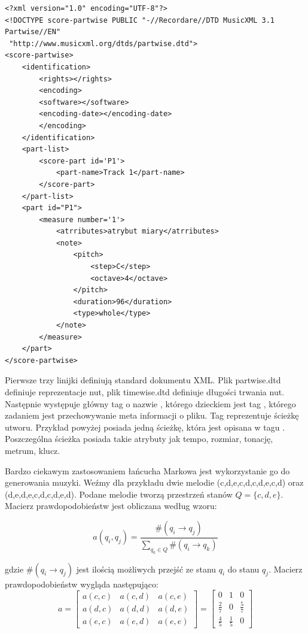 \begin{lstlisting}
<?xml version="1.0" encoding="UTF-8"?>
<!DOCTYPE score-partwise PUBLIC "-//Recordare//DTD MusicXML 3.1 Partwise//EN"
 "http://www.musicxml.org/dtds/partwise.dtd">
<score-partwise>
	<identification>
		<rights></rights>
		<encoding>
		<software></software>
		<encoding-date></encoding-date>
		</encoding>
	</identification>
	<part-list>
		<score-part id='P1'>
			<part-name>Track 1</part-name>
		</score-part>
	</part-list>
	<part id="P1">
		<measure number='1'>
			<atrributes>atrybut miary</atrributes>
			<note>
				<pitch>
					<step>C</step>
					<octave>4</octave>
				</pitch>
				<duration>96</duration>
				<type>whole</type>
			</note>
		</measure>
	</part>
</score-partwise>
\end{lstlisting}

Pierwsze trzy linijki definiują standard dokumentu XML. Plik partwise.dtd definiuje reprezentacje nut, plik timewise.dtd definiuje długości trwania nut. Następnie występuje główny tag o nazwie , którego dzieckiem jest tag , którego zadaniem jest przechowywanie meta informacji o pliku. Tag  reprezentuje ścieżkę utworu. Przykład powyżej posiada jedną ścieżkę, która jest opisana w tagu . Poszczególna ścieżka posiada takie atrybuty jak tempo, rozmiar, tonację, metrum, klucz.


Bardzo ciekawym zastosowaniem łańcucha Markowa jest wykorzystanie go do generowania muzyki.
Weźmy dla przykładu dwie melodie (c,d,e,c,d,c,d,e,c,d) oraz (d,e,d,e,c,d,c,d,e,d). Podane melodie tworzą przestrzeń stanów $Q=\{c,d,e\}$. Macierz prawdopodobieństw jest obliczana według wzoru:

$$ a(q_{i},q_{j}) = \frac{\#(q_{i} \rightarrow q_{j})}{ \sum_{q_{k} \in Q} \#(q_{i} \rightarrow q_{k})} $$

gdzie $\#(q_{i} \rightarrow q_{j})$ jest ilością możliwych przejść ze stanu $q_{i}$ do stanu $q_{j}$. Macierz prawdopodobieństw wygląda następująco:
\[
a =
\begin{bmatrix}
a(c,c) & a(c,d) & a(c,e) \\
a(d,c) & a(d,d) & a(d,e) \\
a(e,c) & a(e,d) & a(e,e)
\end{bmatrix}
=
\begin{bmatrix}

0 & 1 & 0 \\
\frac{2}{7} & 0 & \frac{5}{7} \\
\frac{4}{5} & \frac{1}{5} & 0 

\end{bmatrix}
\] 

